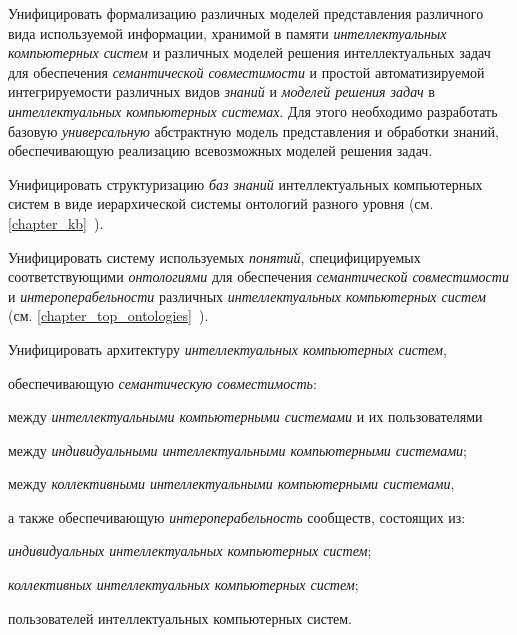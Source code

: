 \begin{textitemize}
	\item  
	Унифицировать формализацию различных моделей представления различного вида используемой информации, хранимой в памяти \textit{интеллектуальных компьютерных систем} и различных моделей решения интеллектуальных задач для обеспечения \textit{семантической совместимости} и простой автоматизируемой интегрируемости различных видов \textit{знаний} и \textit{моделей решения задач} в \textit{интеллектуальных компьютерных системах}. Для этого необходимо разработать базовую \textit{универсальную} абстрактную модель представления и обработки знаний, обеспечивающую реализацию всевозможных моделей решения задач.
	\item  
	Унифицировать структуризацию \textit{баз знаний} интеллектуальных компьютерных систем в виде иерархической системы онтологий разного уровня (см. \ref{chapter_kb}~).
	\item  
	Унифицировать систему используемых \textit{понятий}, специфицируемых соответствующими \textit{онтологиями} для обеспечения \textit{семантической совместимости} и \textit{интероперабельности} различных \textit{интеллектуальных компьютерных систем} (см. \ref{chapter_top_ontologies}~).
	\item  
	Унифицировать архитектуру \textit{интеллектуальных компьютерных систем}, 
	\begin{textitemize}
		\item обеспечивающую \textit{семантическую совместимость}:
		\begin{textitemize}
			\item между \textit{интеллектуальными компьютерными системами} и их пользователями
			\item между \textit{индивидуальными интеллектуальными компьютерными системами};
			\item между \textit{коллективными интеллектуальными компьютерными системами},
		\end{textitemize}
		\item а также обеспечивающую \textit{интероперабельность} сообществ, состоящих из:
		\begin{textitemize}
			\item \textit{индивидуальных интеллектуальных компьютерных систем};
			\item \textit{коллективных интеллектуальных компьютерных систем};
			\item пользователей интеллектуальных компьютерных систем.

\end{textitemize}
\end{textitemize}
\end{textitemize}
